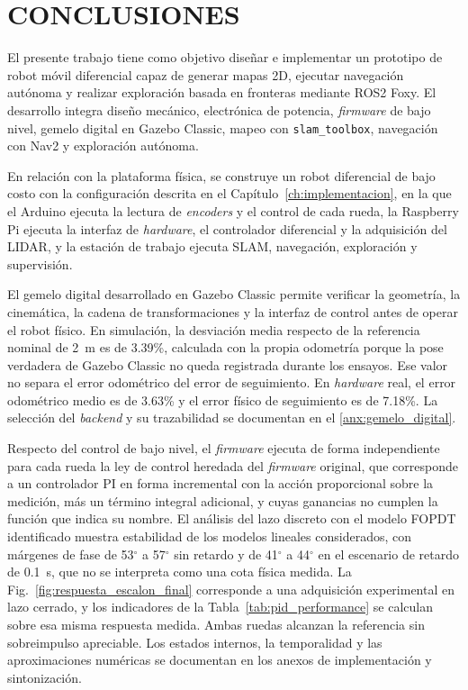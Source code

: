 \chapter*{CONCLUSIONES}
{}

El presente trabajo tiene como objetivo diseñar e implementar un prototipo de robot móvil diferencial capaz de generar mapas 2D, ejecutar navegación autónoma y realizar exploración basada en fronteras mediante \gls{ROS2} Foxy. El desarrollo integra diseño mecánico, electrónica de potencia, \textit{firmware} de bajo nivel, gemelo digital en Gazebo Classic, mapeo con \texttt{slam\_toolbox}, navegación con Nav2 y exploración autónoma.

En relación con la plataforma física, se construye un robot diferencial de bajo
costo con la configuración descrita en el Capítulo~\ref{ch:implementacion}, en
la que el \gls{Arduino} ejecuta la lectura de \textit{encoders} y el control de cada
rueda, la Raspberry Pi ejecuta la interfaz de \textit{hardware}, el controlador
diferencial y la adquisición del \gls{LIDAR}, y la estación de trabajo ejecuta
SLAM, navegación, exploración y supervisión.

El gemelo digital desarrollado en Gazebo Classic permite verificar la geometría,
la cinemática, la cadena de transformaciones y la interfaz de control antes de
operar el robot físico. En simulación, la desviación media respecto de la
referencia nominal de 2~m es de 3.39\%, calculada con la propia odometría porque
la pose verdadera de Gazebo Classic no queda registrada durante los ensayos. Ese valor
no separa el error odométrico del error de seguimiento. En \textit{hardware} real, el
error odométrico medio es de 3.63\% y el error físico de seguimiento es de 7.18\%.
La selección del \textit{backend} y su trazabilidad se documentan en el
\ref{anx:gemelo_digital}.

Respecto del control de bajo nivel, el \textit{firmware} ejecuta de forma independiente
para cada rueda la ley de control heredada del \textit{firmware} original, que
corresponde a un controlador PI en forma incremental con la acción
proporcional sobre la medición, más un término integral adicional, y cuyas
ganancias no cumplen la función que indica su nombre. El análisis del lazo
discreto con el modelo FOPDT identificado muestra estabilidad de los modelos
lineales considerados, con
márgenes de fase de 53$^\circ$ a 57$^\circ$ sin retardo y de 41$^\circ$ a
44$^\circ$ en el escenario de retardo de 0.1~s, que no se interpreta como
una cota física medida. La Fig.~\ref{fig:respuesta_escalon_final} corresponde a una
adquisición experimental en lazo cerrado, y los indicadores de la
Tabla~\ref{tab:pid_performance} se calculan sobre esa misma respuesta medida.
Ambas ruedas alcanzan la referencia sin sobreimpulso apreciable. Los estados internos, la
temporalidad y las aproximaciones numéricas se documentan en los anexos de
implementación y sintonización.

